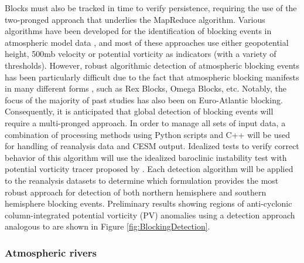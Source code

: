 \documentclass[11pt]{article}
\begin{document}
Blocks must also be tracked in time to verify persistence, requiring the use of the two-pronged approach that underlies the MapReduce algorithm.  Various algorithms have been developed for the identification of blocking events in atmospheric model data \citep{tibaldi1990operational, wiedenmann2002climatology, pelly2003new, scherrer2006two, tyrlis2008aspects, barriopedro2010application, barnes2012methodology}, and most of these approaches use either geopotential height, 500mb velocity or potential vorticity as indicators (with a variety of thresholds).  However, robust algorithmic detection of atmospheric blocking events has been particularly difficult due to the fact that atmospheric blocking manifests in many different forms \citep{haby2008blocking}, such as Rex Blocks, Omega Blocks, etc.  Notably, the focus of the majority of past studies has also been on Euro-Atlantic blocking.  Consequently, it is anticipated that global detection of blocking events will require a multi-pronged approach.  In order to manage all sets of input data, a combination of processing methods using Python scripts and C++ will be used for handling of reanalysis data and CESM output.  Idealized tests to verify correct behavior of this algorithm will use the idealized baroclinic instability test with potential vorticity tracer proposed by \cite{JPWCJJKRBR2013QJRMS}.  Each detection algorithm will be applied to the reanalysis datasets to determine which formulation provides the most robust approach for detection of both northern hemisphere and southern hemisphere blocking events.  Preliminary results showing regions of anti-cyclonic column-integrated potential vorticity (PV) anomalies using a detection approach analogous to \cite{scherrer2006two} are shown in Figure \ref{fig:BlockingDetection}.

\subsubsection{Atmospheric rivers}
\end{document}

